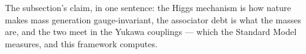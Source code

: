 The subsection's claim, in one sentence: the Higgs mechanism is how nature makes mass generation
gauge-invariant, the associator debt is what the masses are, and the two meet in the Yukawa
couplings --- which the Standard Model measures, and this framework computes.

%
